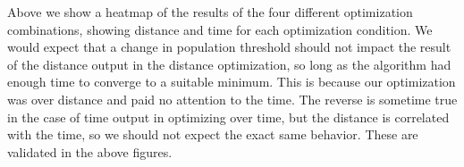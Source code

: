 \documentclass[11pt]{article}
\begin{document}
    Above we show a heatmap of the results of the four different
optimization combinations, showing distance and time for each
optimization condition. We would expect that a change in population
threshold should not impact the result of the distance output in the
distance optimization, so long as the algorithm had enough time to
converge to a suitable minimum. This is because our optimization was
over distance and paid no attention to the time. The reverse is sometime
true in the case of time output in optimizing over time, but the
distance is correlated with the time, so we should not expect the exact
same behavior. These are validated in the above figures.


    
    
    
    
\end{document}
